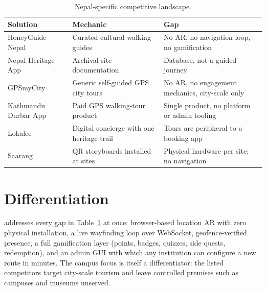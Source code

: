 \begin{table}[H]
  \centering\small
  \begin{tabular}{@{}p{}p{}p{}@{}}
    \toprule
    \textbf{Solution} & \textbf{Mechanic} & \textbf{Gap} \\
    \midrule
    HoneyGuide Nepal & Curated cultural walking guides & No AR, no navigation loop, no gamification \\
    Nepal Heritage App & Archival site documentation & Database, not a guided journey \\
    GPSmyCity & Generic self-guided GPS city tours & No AR, no engagement mechanics, city-scale only \\
    Kathmandu Durbar App & Paid GPS walking-tour product & Single product, no platform or admin tooling \\
    Lokalee & Digital concierge with one heritage trail & Tours are peripheral to a booking app \\
    Saarang & QR storyboards installed at sites & Physical hardware per site; no navigation \\
    \bottomrule
  \end{tabular}
  \caption{Nepal-specific competitive landscape.}
  \label{tab:competitors}
\end{table}

\section{Differentiation}
\projectname{} addresses every gap in Table~\ref{tab:competitors} at once:
browser-based location AR with zero physical installation, a live wayfinding
loop over WebSocket, geofence-verified presence, a full gamification layer
(points, badges, quizzes, side quests, redemption), and an admin GUI with
which any institution can configure a new route in minutes. The campus focus
is itself a differentiator: the listed competitors target city-scale tourism
and leave controlled premises such as campuses and museums unserved.
